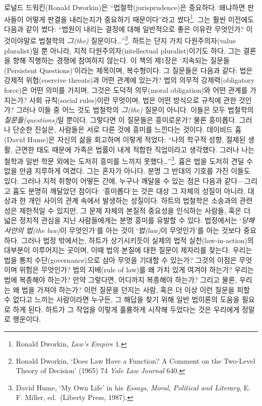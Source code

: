 \documentclass[12pt, oneside]{book}  %
\begin{document}
로널드 드워킨(Ronald Dworkin)은 ``법철학(jurisprudence)은 중요하다.
왜냐하면 판사들이 어떻게 판결을 내리는지가 중요하기 때문이다''라고
썼다\footnote{Ronald Dworkin, \emph{Law's Empire} 1.}. 그는 훨씬
이전에도 다음과 같이 썼다: ``법원이 내리는 결정에 대해 일반적으로 좋은
이유란 무엇인가? 이것이야말로 법철학의 \emph{그(the)}
질문이다\ldots{}''\footnote{Ronald Dworkin, `Does Law Have a Function? A
  Comment on the Two-Level Theory of Decision' (1965) 74 \emph{Yale Law
  Journal} 640.}. 하트는 단지 가치 다원주의자(value pluralist)일 뿐
아니라, 지적 다원주의자(intellectual pluralist)이기도 하다. 그는 결론을
향해 직행하는 경쟁에 참여하지 않는다. 이 책의 제1장은 `지속되는
질문들(Persistent Questions)'이라는 제목이며, 복수형이다. 그 질문들은
다음과 같다: 법은 강제적 위협(coercive threats)과 어떤 관계에 있는가?
법의 의무적 강제력(obligatory force)은 어떤 의미를 가지며, 그것은 도덕적
의무(moral obligation)와 어떤 관계를 가지는가? 사회 규칙(social
rules)이란 무엇이며, 법은 어떤 방식으로 규칙에 관한 것인가? 그러나 이들
중 어느 것도 법철학의 \emph{그(the)} 질문이 아니다. 이들은 모두 법철학의
\emph{질문들(questions)}일 뿐이다. 그렇다면 이 질문들은 흥미로운가? 물론
흥미롭다. 그러나 단순한 진실은, 사람들은 서로 다른 것에 흥미를 느낀다는
것이다. 데이비드 흄(David Hume)은 자신의 삶을 회고하며 이렇게 적었다:
``나의 학구적 성향, 절제된 생활, 근면한 태도 때문에 가족은 법률이 내게
적합한 직업이라고 생각했다. 그러나 나는 철학과 일반 학문 외에는 도저히
흥미를 느끼지 못했다\ldots{}''\footnote{David Hume, `My Own Life' in his
  \emph{Essays}, \emph{Moral, Political and Literary}, E. F. Miller,
  ed.~(Liberty Press, 1987).}. 흄은 법을 도저히 견딜 수 없을 만큼
지루하게 여겼다. 그는 혼자가 아니다. 분명 그 반대의 기호를 가진 이들도
있다. 그러나 지적 취향이 어떻든 간에, 누구나 깨달을 수 있는 점은 다음과
같다---그리고 흄도 분명히 깨달았던 점이다: `흥미롭다'는 것은 대상 그
자체의 성질이 아니라, 대상과 한 개인 사이의 관계 속에서 발생하는
성질이다. 하트의 법철학은 소송과의 관련성은 제한적일 수 있지만, 그 문제
자체의 본질적 중요성을 인식하는 사람들, 혹은 더 넓은 정치적 관심을 지닌
사람들에게는 분명 흥미를 유발할 수 있다. 법정에서는 `\emph{당해 사안의
법(the law)}이 무엇인가'를 아는 것이 `\emph{법(law)}이 무엇인가'를 아는
것보다 중요하다. 그러나 법정 밖에서는, 하트가 상기시키듯이 실제의 법적
실천(law-in-action)의 대부분이 이루어지는 곳이며, 이때 법의 본질에 대한
질문이 제자리를 찾는다. 우리는 법을 통치 수단(governance)으로 삼아
무엇을 기대할 수 있는가? 그것의 이점은 무엇이며 위험은 무엇인가? 법의
지배(rule of law)를 왜 가치 있게 여겨야 하는가? 우리는 법에 복종해야
하는가? 만약 그렇다면, 어디까지 복종해야 하는가? 그리고 물론, 우리는 왜
법을 가져야 하는가? 이런 질문을 던지는 사람, 혹은 더 이상 이런 질문을
피할 수 없다고 느끼는 사람이라면 누구든, 그 해답을 찾기 위해 일반
법이론의 도움을 필요로 하게 된다. 하트가 그 작업을 이렇게 훌륭하게
시작해 두었다는 것은 우리에게 정말로 행운이다.
\end{document}
